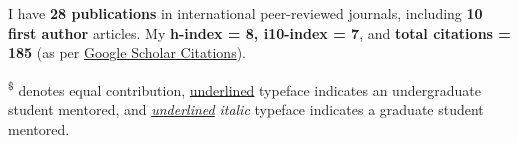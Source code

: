 

\hfill
\par

I have \textbf{28 publications} in international peer-reviewed journals, including \textbf{10 first author} articles. My \textbf{h-index = 8, i10-index = 7}, and \textbf{total citations = 185} (as per \href{https://scholar.google.com/citations?user=kvf8JJQAAAAJ&hl=en}{Google Scholar Citations}).
\nocite{*}

\begin{footnotesize}  
    \textsuperscript{\$} denotes equal contribution, \underline{underlined} typeface indicates an undergraduate student mentored, and \textit{\underline{underlined}} \textit{italic} typeface indicates
     a graduate student mentored.
    \end{footnotesize}

\printbibliography[heading={subbibliography},title={Journal Articles},type=article]
\printbibliography[heading={subbibliography},title={Under Review},type=unpublished]
\printbibliography[heading={subbibliography},title={Manuals},type=manual]
\printbibliography[heading={subbibliography},title={Abstract / Oral / Conferences},type=inbook]
\printbibliography[heading={subbibliography},title={Other Conferences and Workshops },type=misc]






